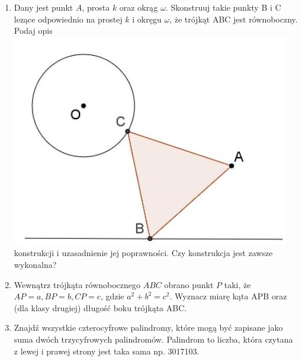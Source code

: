 \documentclass[10pt]{article}
\begin{document}
\begin{enumerate}
  \item Dany jest punkt \(A\), prosta \(k\) oraz okrąg \(\omega\). Skonstruuj takie punkty B i C lezące odpowiednio na prostej \(k\) i okręgu \(\omega\), że trójkąt ABC jest równoboczny. Podaj opis\\
\includegraphics[max width=\textwidth, center]{2024_11_21_08cb668264822452503bg-1}\\
konstrukcji i uzasadnienie jej poprawności. Czy konstrukcja jest zawsze wykonalna?
  \item Wewnątrz trójkąta równobocznego \(A B C\) obrano punkt \(P\) taki, że \(A P=a, B P=b, C P=c\), gdzie \(a^{2}+b^{2}=c^{2}\). Wyznacz miarę kąta APB oraz (dla klasy drugiej) długość boku trójkąta ABC.
  \item Znajdź wszystkie czterocyfrowe palindromy, które mogą być zapisane jako suma dwóch trzycyfrowych palindromów. Palindrom to liczba, która czytana z lewej i prawej strony jest taka sama np. 3017103.
\end{enumerate}
\end{document}
